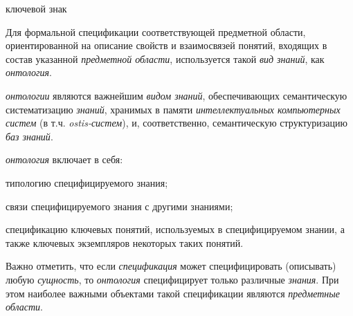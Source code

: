 \begin{SCn}
	\begin{scnrelfromlist}{ключевой знак}
	\end{scnrelfromlist}
\end{SCn}

Для формальной спецификации соответствующей предметной области, ориентированной на описание свойств и взаимосвязей понятий, входящих в состав указанной \textit{предметной области}, используется такой \textit{вид знаний}, как \textit{онтология}.

\textit{онтологии} являются важнейшим \textit{видом знаний}, обеспечивающих семантическую систематизацию \textit{знаний}, хранимых в памяти \textit{интеллектуальных компьютерных систем} (в т.ч. \textit{ostis-систем}), и, соответственно, семантическую структуризацию \textit{баз знаний}.

\begin{SCn}
\end{SCn}

\textit{онтология} включает в себя:
\begin{textitemize}
	\item {типологию специфицируемого знания};
	\item{связи специфицируемого знания с другими знаниями};
	\item{спецификацию ключевых понятий, используемых в специфицируемом знании, а также ключевых экземпляров некоторых таких понятий}.
\end{textitemize}

Важно отметить, что если \textit{спецификация} может специфицировать (описывать) любую \textit{сущность}, то \textit{онтология} специфицирует только различные \textit{знания}. При этом наиболее важными объектами такой спецификации являются \textit{предметные области}.

